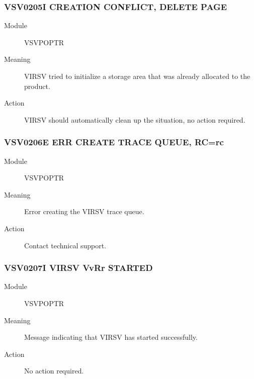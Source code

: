 \documentclass[letterpaper,10pt,english]{sphinxmanual}
\begin{document}
\subsubsection{VSV0205I CREATION CONFLICT, DELETE PAGE}
\label{\detokenize{messages:vsv0205i-creation-conflict-delete-page}}\begin{description}
\item[{Module}] \leavevmode
VSVPOPTR

\item[{Meaning}] \leavevmode
VIRSV tried to initialize a storage area that was already allocated to the product.

\item[{Action}] \leavevmode
VIRSV should automatically clean up the situation, no action required.

\end{description}


\subsubsection{VSV0206E ERR CREATE TRACE QUEUE, RC=rc}
\label{\detokenize{messages:vsv0206e-err-create-trace-queue-rc-rc}}\begin{description}
\item[{Module}] \leavevmode
VSVPOPTR

\item[{Meaning}] \leavevmode
Error creating the VIRSV trace queue.

\item[{Action}] \leavevmode
Contact technical support.

\end{description}


\subsubsection{VSV0207I VIRSV VvRr STARTED}
\label{\detokenize{messages:vsv0207i-virsv-vvrr-started}}\begin{description}
\item[{Module}] \leavevmode
VSVPOPTR

\item[{Meaning}] \leavevmode
Message indicating that VIRSV has started successfully.

\item[{Action}] \leavevmode
No action required.

\end{description}
\end{document}
